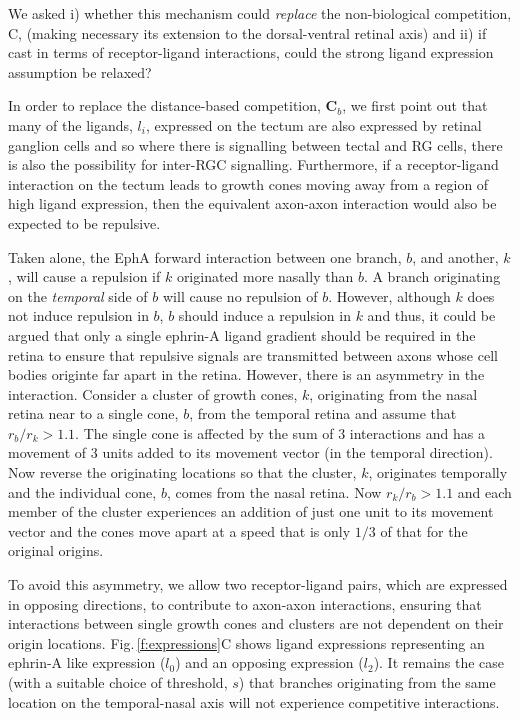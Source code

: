 \documentclass[11pt, a4paper]{article}
\begin{document}
We asked i) whether this mechanism could \emph{replace} the non-biological
competition, C, (making necessary its extension to the dorsal-ventral retinal
axis) and ii) if cast in terms of receptor-ligand interactions, could the
strong ligand expression assumption be relaxed?





In order to replace the distance-based competition, $\mathbf{C}_b$, we first
point out that many of the ligands, $l_i$, expressed on the tectum are also
expressed by retinal ganglion cells and so where there is signalling between
tectal and RG cells, there is also the possibility for inter-RGC
signalling. Furthermore, if a receptor-ligand interaction on the tectum leads
to growth cones moving away from a region of high ligand expression, then the
equivalent axon-axon interaction would also be expected to be repulsive.

Taken alone, the EphA forward interaction between one branch, $b$, and
another, $k$, will cause a repulsion if $k$ originated more nasally than
$b$. A branch originating on the \emph{temporal} side of $b$ will cause no
repulsion of $b$. However, although $k$ does not induce repulsion in $b$, $b$
should induce a repulsion in $k$ and thus, it could be argued that only a
single ephrin-A ligand gradient should be required in the retina to ensure
that repulsive signals are transmitted between axons whose cell bodies
originte far apart in the retina. However, there is an asymmetry in the
interaction. Consider a cluster of growth cones, $k$, originating from the
nasal retina near to a single cone, $b$, from the temporal retina and assume
that $r_b/r_k>1.1$. The single cone is affected by the sum of 3 interactions
and has a movement of 3 units added to its movement vector (in the temporal
direction). Now reverse the originating locations so that the cluster, $k$,
originates temporally and the individual cone, $b$, comes from the nasal
retina. Now $r_k/r_b>1.1$ and each member of the cluster experiences an
addition of just one unit to its movement vector and the cones move apart at a
speed that is only $1/3$ of that for the original origins.

To avoid this asymmetry, we allow two receptor-ligand pairs, which are
expressed in opposing directions, to contribute to axon-axon interactions,
ensuring that interactions between single growth cones and clusters are not
dependent on their origin locations. Fig.\,\ref{f:expressions}C shows ligand
expressions representing an ephrin-A like expression ($l_0$) and an opposing
expression ($l_2$). It remains the case (with a suitable choice of threshold,
$s$) that branches originating from the same location on the temporal-nasal
axis will not experience competitive interactions.
\end{document}
